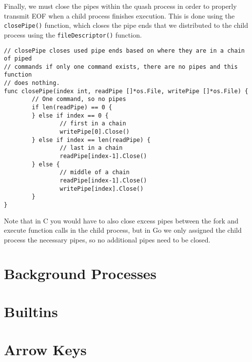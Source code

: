 \documentclass[12pt]{article}
\begin{document}
Finally, we must close the pipes within the quash process in order to properly
transmit EOF when a child process finishes execution. This is done using the
\texttt{closePipe()} function, which closes the pipe ends that we distributed to the
child process using the \texttt{fileDescriptor()} function.
\begin{verbatim}
// closePipe closes used pipe ends based on where they are in a chain of piped
// commands if only one command exists, there are no pipes and this function
// does nothing.
func closePipe(index int, readPipe []*os.File, writePipe []*os.File) {
        // One command, so no pipes
        if len(readPipe) == 0 {
        } else if index == 0 {
                // first in a chain
                writePipe[0].Close()
        } else if index == len(readPipe) {
                // last in a chain
                readPipe[index-1].Close()
        } else {
                // middle of a chain
                readPipe[index-1].Close()
                writePipe[index].Close()
        }
}
\end{verbatim}
Note that in C you would have to also close excess pipes between the fork and
execute function calls in the child process, but in Go we only assigned the
child process the necessary pipes, so no additional pipes need to be closed. 
\section{Background Processes}
\label{sec:org72eea1a}
\section{Builtins}
\label{sec:org6c0805b}
\section{Arrow Keys}
\label{sec:orgc600fcc}
\end{document}
